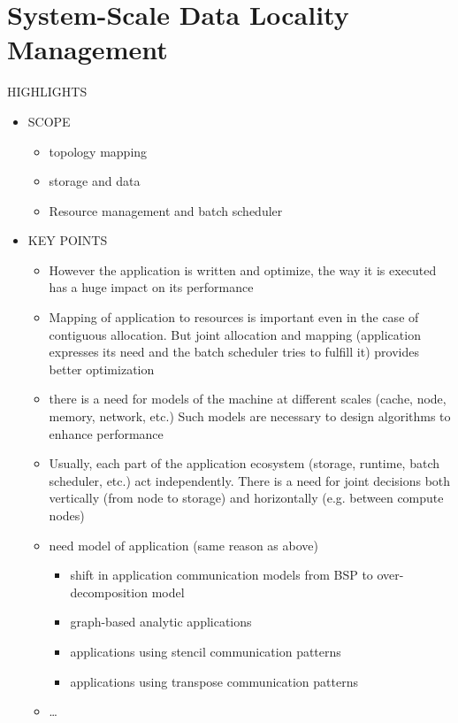 \chapter{System-Scale Data Locality Management}
\label{ch:systemscale}







HIGHLIGHTS

\begin{itemize}

\item SCOPE

\begin{itemize}
\item topology mapping
\item storage and data
\item Resource management and batch scheduler
\end{itemize}

\item KEY POINTS

\begin{itemize}
\item However the application is written and optimize, the way it is executed
  has a huge impact on its performance
 \item Mapping of application to resources is important even in the case of
   contiguous allocation. But joint allocation and mapping  (application
   expresses its need and the batch scheduler tries to fulfill it) provides
   better optimization
\item there is a need for models of the machine at different scales (cache, node,
memory, network, etc.) Such models are necessary to design algorithms to enhance
performance
  \item Usually, each part of the application ecosystem (storage, runtime, batch
    scheduler, etc.) act independently. There is a need for joint decisions both
    vertically (from node to storage) and horizontally (e.g. between compute
    nodes)
\item need model of application (same reason as above)
\begin{itemize}
\item shift in application communication models from BSP to over-decomposition model
\item graph-based analytic applications
\item applications using stencil communication patterns
\item applications using transpose communication patterns
\end{itemize}
\item \ldots
\end{itemize}


\end{itemize}
